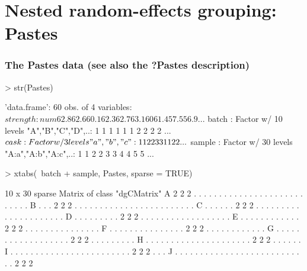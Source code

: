 \section[Pastes]{Nested random-effects grouping: Pastes}

\begin{frame}[fragile]
  \frametitle{The Pastes data (see also the ?Pastes description)}
\begin{Schunk}
\begin{Sinput}
> str(Pastes)
\end{Sinput}
\begin{Soutput}
'data.frame':	60 obs. of  4 variables:
 $ strength: num  62.8 62.6 60.1 62.3 62.7 63.1 60 61.4 57.5 56.9 ...
 $ batch   : Factor w/ 10 levels "A","B","C","D",..: 1 1 1 1 1 1 2 2 2 2 ...
 $ cask    : Factor w/ 3 levels "a","b","c": 1 1 2 2 3 3 1 1 2 2 ...
 $ sample  : Factor w/ 30 levels "A:a","A:b","A:c",..: 1 1 2 2 3 3 4 4 5 5 ...
\end{Soutput}
\begin{Sinput}
> xtabs(~batch + sample, Pastes, sparse = TRUE)
\end{Sinput}
\begin{Soutput}
10 x 30 sparse Matrix of class "dgCMatrix"
A 2 2 2 . . . . . . . . . . . . . . . . . . . . . . . . . . .
B . . . 2 2 2 . . . . . . . . . . . . . . . . . . . . . . . .
C . . . . . . 2 2 2 . . . . . . . . . . . . . . . . . . . . .
D . . . . . . . . . 2 2 2 . . . . . . . . . . . . . . . . . .
E . . . . . . . . . . . . 2 2 2 . . . . . . . . . . . . . . .
F . . . . . . . . . . . . . . . 2 2 2 . . . . . . . . . . . .
G . . . . . . . . . . . . . . . . . . 2 2 2 . . . . . . . . .
H . . . . . . . . . . . . . . . . . . . . . 2 2 2 . . . . . .
I . . . . . . . . . . . . . . . . . . . . . . . . 2 2 2 . . .
J . . . . . . . . . . . . . . . . . . . . . . . . . . . 2 2 2
\end{Soutput}
\end{Schunk}
\end{frame}

